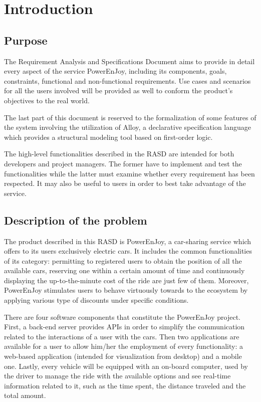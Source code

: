 \chapter{Introduction}

\section{Purpose}
The Requirement Analysis and Specifications Document aims to provide in detail every aspect of the service PowerEnJoy, including its components, goals, constraints, functional and non-functional requirements. Use cases and scenarios for all the users involved will be provided as well to conform the product's objectives to the real world.

The last part of this document is reserved to the formalization of some features of the system involving the utilization of Alloy, a declarative specification language which provides a structural modeling tool based on first-order logic.

The high-level functionalities described in the RASD are intended for both developers and project managers. The former have to implement and test the functionalities while the latter must examine whether every requirement has been respected. It may also be useful to users in order to best take advantage of the service.

\section{Description of the problem}
The product described in this RASD is PowerEnJoy, a car-sharing service which offers to its users exclusively electric cars. It includes the common functionalities of its category: permitting to registered users to obtain the position of all the available cars, reserving one within a certain amount of time and continuously displaying the up-to-the-minute cost of the ride are just few of them. Moreover, PowerEnJoy stimulates users to behave virtuously towards to the ecosystem by applying various type of discounts under specific conditions.

There are four software components that constitute the PowerEnJoy project. First, a back-end server provides APIs in order to simplify the communication related to the interactions of a user with the cars. Then two applications are available for a user to allow him/her the employment of every functionality: a web-based application (intended for visualization from desktop) and a mobile one. Lastly, every vehicle will be equipped with an on-board computer, used by the driver to manage the ride with the available options and see real-time information related to it, such as the time spent, the distance traveled and the total amount.

